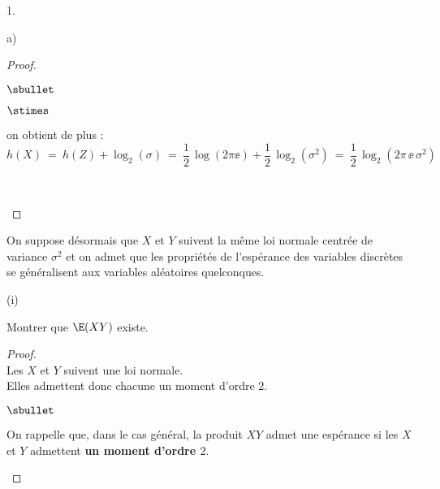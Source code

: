 \documentclass[11pt]{article}%
\begin{document}
\begin{noliste}{1.}
\begin{noliste}{a)}
\begin{proof}
\begin{noliste}{$\sbullet$}
\begin{noliste}{$\stimes$}
        \item on obtient de plus :
          \[
            h(X) \ = \ h(Z) + \log_2(\sigma) \ = \ \dfrac{1}{2} \,
            \log(2 \pi \ee) + \dfrac{1}{2} \, \log_2(\sigma^2) \ = \
            \dfrac{1}{2} \, \log_2(2 \pi \, \ee \, \sigma^2)
          \]
        \end{noliste}
        \conc{$h(X) \ = \ \dfrac{1}{2} \, \log_2(2 \pi \, \ee \,
          \sigma^2)$}~\\[-1.4cm]
      \end{noliste}
    \end{proof}
    
  \item On suppose désormais que $X$ et $Y$ suivent la même loi
    normale centrée de variance $\sigma^2$ et on admet que les
    propriétés de l'espérance des variables discrètes se généralisent
    aux variables aléatoires quelconques.
    \begin{nonoliste}{(i)}
      \setlength{\itemsep}{2mm}
    \item Montrer que $\E(XY)$ existe.

      \begin{proof}~\\
        Les \var $X$ et $Y$ suivent une loi normale.\\
        Elles admettent donc chacune un moment d'ordre $2$.


        \newpage
        

        \begin{remark}
          \begin{noliste}{$\sbullet$}
          \item On rappelle que, dans le cas général, la \var produit
            $XY$ admet une espérance si les \var $X$ et $Y$ admettent
            {\bf un moment d'ordre $2$}.
            

\end{noliste}
\end{remark}
\end{proof}
\end{nonoliste}
\end{noliste}
\end{noliste}
\end{document}
